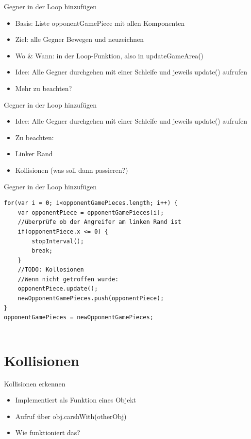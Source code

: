 \documentclass[18pt]{beamer}
\begin{document}
\begin{frame}{Gegner in der Loop hinzufügen}
\begin{itemize}
	\item Basis: Liste opponentGamePiece mit allen Komponenten
	\item Ziel: alle Gegner Bewegen und neuzeichnen 
	\item Wo \& Wann: in der Loop-Funktion, also in updateGameArea()
	\item Idee: Alle Gegner durchgehen mit einer Schleife und jeweils update() aufrufen
	\item Mehr zu beachten? 
\end{itemize}
\end{frame}

\begin{frame}{Gegner in der Loop hinzufügen}
\begin{itemize}
	\item Idee: Alle Gegner durchgehen mit einer Schleife und jeweils update() aufrufen
	\item Zu beachten:
	\item Linker Rand
	\item Kollisionen (was soll dann passieren?) 
\end{itemize}
\end{frame}

\begin{frame}[fragile]{Gegner in der Loop hinzufügen}
\begin{lstlisting}	
for(var i = 0; i<opponentGamePieces.length; i++) {
	var opponentPiece = opponentGamePieces[i];
	//überprüfe ob der Angreifer am linken Rand ist
	if(opponentPiece.x <= 0) {
		stopInterval();
		break;
	}
	//TODO: Kollosionen
	//Wenn nicht getroffen wurde: 
	opponentPiece.update();
	newOpponentGamePieces.push(opponentPiece);
}
opponentGamePieces = newOpponentGamePieces;
	
\end{lstlisting}
\end{frame}

\section{Kollisionen}
\begin{frame}{Kollisionen erkennen}
\begin{itemize}
	\item Implementiert als Funktion eines Objekt
	\item Aufruf über obj.carshWith(otherObj)
	\item Wie funktioniert das?
\end{itemize}

\end{frame}
\end{document}
